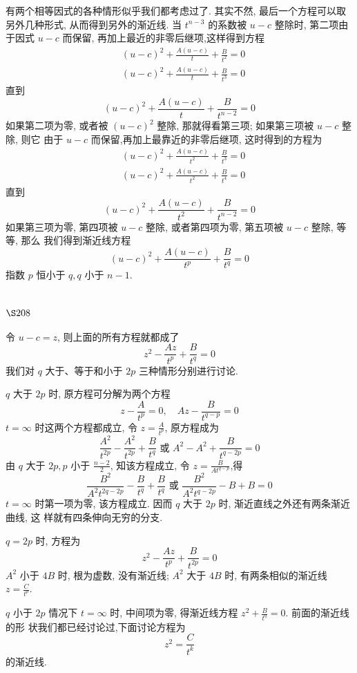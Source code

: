 有两个相等因式的各种情形似乎我们都考虑过了. 其实不然, 最后一个方程可以取 另外几种形式, 从而得到另外的渐近线. 当 $t^{n-3}$ 的系数被 $u-c$ 整除时, 第二项由于因式 $u-c$ 而保留, 再加上最近的非零后继项,这样得到方程
\[
\begin{aligned}
& (u-c)^{2}+\frac{A(u-c)}{t}+\frac{B}{t^{2}}=0 \\
& (u-c)^{2}+\frac{A(u-c)}{t}+\frac{B}{t^{3}}=0
\end{aligned}
\]
直到
\[
(u-c)^{2}+\frac{A(u-c)}{t}+\frac{B}{t^{n-2}}=0
\]
如果第二项为零, 或者被 $(u-c)^{2}$ 整除, 那就得看第三项; 如果第三项被 $u-c$ 整除, 则它 由于 $u-c$ 而保留,再加上最靠近的非零后继项, 这时得到的方程为
\[
\begin{aligned}
& (u-c)^{2}+\frac{A(u-c)}{t^{2}}+\frac{B}{t^{3}}=0 \\
& (u-c)^{2}+\frac{A(u-c)}{t^{2}}+\frac{B}{t^{4}}=0
\end{aligned}
\]
直到
\[
(u-c)^{2}+\frac{A(u-c)}{t^{2}}+\frac{B}{t^{n-2}}=0
\]
如果第三项为零, 第四项被 $u-c$ 整除, 或者第四项为零, 第五项被 $u-c$ 整除, 等等, 那么 我们得到渐近线方程
\[
(u-c)^{2}+\frac{A(u-c)}{t^{p}}+\frac{B}{t^{q}}=0
\]
指数 $p$ 恒小于 $q, q$ 小于 $n-1$.

\section{$\S 208$}
 令 $ u-c=z $, 则上面的所有方程就都成了 
\[
z^{2}-\frac{A z}{t^{p}}+\frac{B}{t^{q}}=0
\]
我们对 $q$ 大于、等于和小于 $2 p$ 三种情形分别进行讨论.

$q$ 大于 $2 p$ 时, 原方程可分解为两个方程
\[
z-\frac{A}{t^{p}}=0, \quad A z-\frac{B}{t^{q-p}}=0
\]
$t=\infty$ 时这两个方程都成立, 令 $z=\frac{A}{t^{p}}$, 原方程成为
\[
\frac{A^{2}}{t^{2 p}}-\frac{A^{2}}{t^{2 p}}+\frac{B}{t^{q}} \text { 或 } A^{2}-A^{2}+\frac{B}{t^{q-2 p}}=0
\]
由 $q$ 大于 $2 p, p$ 小于 $\frac{n-2}{2}$, 知该方程成立, 令 $z=\frac{B}{A t^{q-p}}$,得
\[
\frac{B^{2}}{A^{2} t^{2 q-2 p}}-\frac{B}{t^{q}}+\frac{B}{t^{q}} \text { 或 } \frac{B^{2}}{A^{2} t^{q-2 p}}-B+B=0
\]
$t=\infty$ 时第一项为零, 该方程成立. 因而 $q$ 大于 $2 p$ 时, 渐近直线之外还有两条渐近曲线, 这 样就有四条伸向无穷的分支.

$q=2 p$ 时, 方程为
\[
z^{2}-\frac{A z}{t^{p}}+\frac{B}{t^{2 p}}=0
\]
$A^{2}$ 小于 $4 B$ 时, 根为虚数, 没有渐近线; $A^{2}$ 大于 $4 B$ 时, 有两条相似的渐近线 $z=\frac{C}{t^{p}}$.

$q$ 小于 $2 p$ 情况下 $t=\infty$ 时, 中间项为零, 得渐近线方程 $z^{2}+\frac{B}{t^{q}}=0$. 前面的渐近线的形 状我们都已经讨论过,下面讨论方程为
\[
z^{2}=\frac{C}{t^{k}}
\]
的渐近线. 

